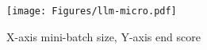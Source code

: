 {
\begin{figure}[h]
\begin{center}
\centerline{\texttt{[image: Figures/llm-micro.pdf]}}
\end{center}
\vspace{-0.3in}
{
X-axis mini-batch size, Y-axis end score
}
\vspace{0.05in}
\end{figure}
}